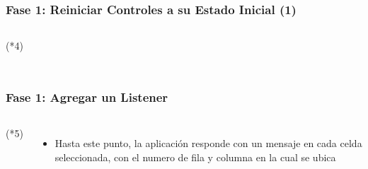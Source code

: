\begin{frame}[fragile]
\frametitle{Fase 1: Reiniciar Controles a su Estado Inicial (1)} 
\begin{columns}
\begin{block}{(*4)}
\inputminted[linenos,fontsize=\tiny]{kotlin}{00_ComportamientoAplicacionTicTacToe/ReiniciarControles.kt}
\end{block}


\end{columns}
\end{frame}

\begin{frame}[fragile]
\frametitle{Fase 1: Agregar un Listener} 
\begin{columns}

\begin{block}{(*5)}
\inputminted[linenos,fontsize=\tiny]{kotlin}{00_ComportamientoAplicacionTicTacToe/CeldaGato.kt}
\end{block}
\begin{itemize}
\item Hasta este punto, la aplicación responde con un mensaje en cada celda seleccionada, con el numero de fila y columna en la cual se ubica
\end{itemize}




\end{columns}
\end{frame}
